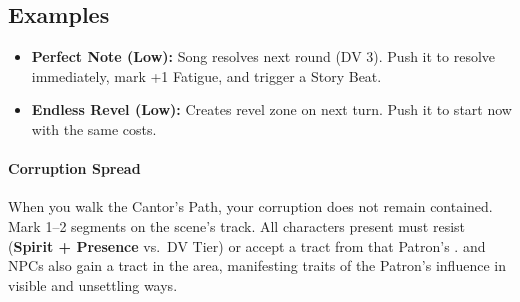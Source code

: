\subsection*{Examples}
\begin{itemize}
\item \textbf{Perfect Note (Low):} Song resolves next round (DV 3). Push it to resolve immediately, mark +1 Fatigue, and trigger a Story Beat.
\item \textbf{Endless Revel (Low):} Creates revel zone on next turn. Push it to start now with the same costs.
\end{itemize}

\paragraph{Corruption Spread}
When you walk the Cantor’s Path, your corruption does not remain contained. 
Mark 1--2 segments on the scene’s  track. 
All characters present must resist (\textbf{Spirit + Presence} vs.~DV Tier) or accept a tract from that Patron’s . 
 and  NPCs also gain a tract in the area, manifesting traits of the Patron’s influence in visible and unsettling ways.